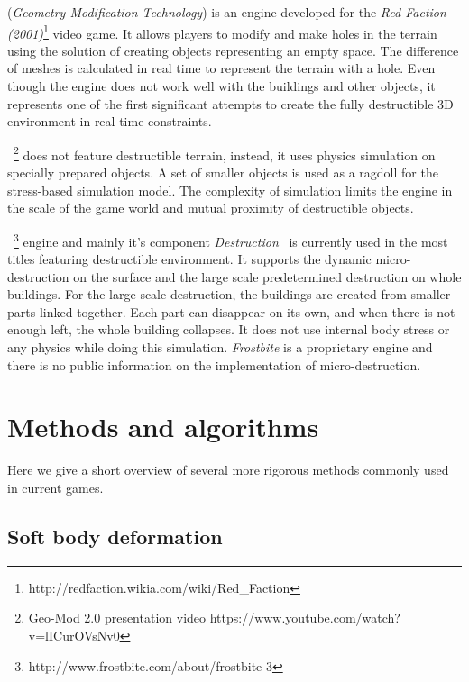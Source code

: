  (\emph{Geometry Modification Technology}\cite{geomod}) is an engine developed for the \emph{Red Faction (2001)}\footnote{http://redfaction.wikia.com/wiki/Red\_Faction} video game. It allows players to modify and make holes in the terrain using the solution of creating objects representing an empty space. The difference of meshes is calculated in real time to represent the terrain with a hole. Even though the engine does not work well with the buildings and other objects, it represents one of the first significant attempts to create the fully destructible 3D environment in real time constraints.

~\cite{geomod}\footnote{Geo-Mod 2.0 presentation video https://www.youtube.com/watch?v=lICurOVsNv0} does not feature destructible terrain, instead, it uses physics simulation on specially prepared objects. A set of smaller objects is used as a ragdoll for the stress-based simulation model. The complexity of simulation limits the engine in the scale of the game world and mutual proximity of destructible objects.


~\footnote{http://www.frostbite.com/about/frostbite-3} engine and mainly it's component \emph{Destruction}~\cite{destruction} is currently used in the most titles featuring destructible environment. It supports the dynamic micro-destruction on the surface and the large scale predetermined destruction on whole buildings. For the large-scale destruction, the buildings are created from smaller parts linked together. Each part can disappear on its own, and when there is not enough left, the whole building collapses. It does not use internal body stress or any physics while doing this simulation. \emph{Frostbite} is a proprietary engine and there is no public information on the implementation of micro-destruction.

\section{Methods and algorithms}

Here we give a short overview of several more rigorous methods commonly used in current games.

\subsection{Soft body deformation}

